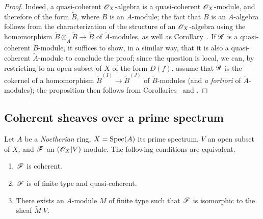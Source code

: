 \begin{proof}
Indeed, a quasi-coherent $\mathscr{O}_X$-algebra is a quasi-coherent $\mathscr{O}_X$-module, and therefore of the form $\widetilde{B}$, where $B$ is an $A$-module;
the fact that $B$ is an $A$-algebra follows from the characterization of the structure of an $\mathscr{O}_X$-algebra using the homomorphism $\widetilde{B}\otimes_{\widetilde{A}}\widetilde{B}\to\widetilde{B}$ of $\widetilde{A}$-modules, as well as Corollary~.
If $\mathscr{G}$ is a quasi-coherent $\widetilde{B}$-module, it suffices to show, in a similar way, that it is also a quasi-coherent $\widetilde{A}$-module to conclude the proof;
since the question is local, we can, by restricting to an open subset of $X$ of the form $D(f)$, assume that $\mathscr{G}$ is the cokernel of a homomorphism $\widetilde{B}^{(I)}\to\widetilde{B}^{(J)}$ of $\widetilde{B}$-modules (and \emph{a fortiori} of $\widetilde{A}$-modules);
the proposition then follows from Corollaries~ and .
\end{proof}

\subsection{Coherent sheaves over a prime spectrum}
\label{subsection:I.1.5}

\begin{theorem}[1.5.1]
\label{I.1.5.1}
Let $A$ be a \emph{Noetherian} ring, $X=\operatorname{Spec}(A)$ its prime spectrum, $V$ an open subset of $X$, and $\mathscr{F}$ an $(\mathscr{O}_X|V)$-module.
The following conditions are equivalent.
\begin{enumerate}
  \item[{\rm(a)}] $\mathscr{F}$ is coherent.
  \item[{\rm(b)}] $\mathscr{F}$ is of finite type and quasi-coherent.
  \item[{\rm(c)}] There exists an $A$-module $M$ of finite type such that $\mathscr{F}$ is isomorphic to the sheaf $\widetilde{M}|V$.
\end{enumerate}
\end{theorem}


